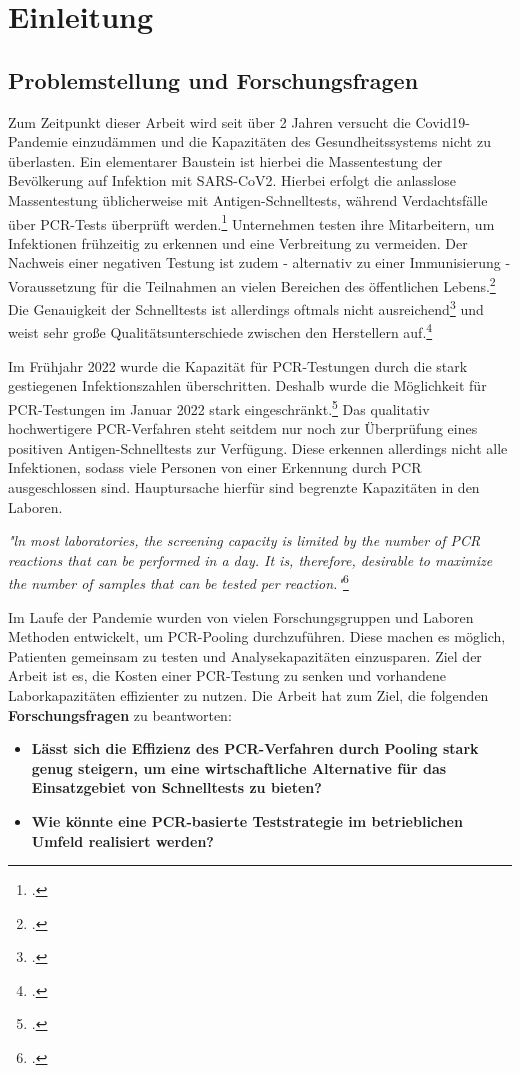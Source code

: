 \chapter{Einleitung}
\section{Problemstellung und Forschungsfragen}
Zum Zeitpunkt dieser Arbeit wird seit über 2 Jahren versucht die Covid19-Pandemie einzudämmen und die Kapazitäten des Gesundheitssystems nicht zu überlasten.
Ein elementarer Baustein ist hierbei die Massentestung der Bevölkerung auf Infektion mit SARS-CoV2.
Hierbei erfolgt die anlasslose Massentestung üblicherweise mit Antigen-Schnelltests, während Verdachtsfälle über PCR-Tests überprüft werden.\footcite{bund_testverordnung_2021}
Unternehmen testen ihre Mitarbeitern, um Infektionen frühzeitig zu erkennen und eine Verbreitung zu vermeiden.
Der Nachweis einer negativen Testung ist zudem - alternativ zu einer Immunisierung - Voraussetzung für die Teilnahmen an vielen Bereichen des öffentlichen Lebens.\footcite{land_corona-verordnung_2022}
Die Genauigkeit der Schnelltests ist allerdings oftmals nicht ausreichend\footcite{wagenhauser_clinical_2021} und weist sehr große Qualitätsunterschiede zwischen den Herstellern auf.\footcite{zerforschung_zerforschung_2022}

Im Frühjahr 2022 wurde die Kapazität für PCR-Testungen durch die stark gestiegenen Infektionszahlen überschritten.
Deshalb wurde die Möglichkeit für PCR-Testungen im Januar 2022 stark eingeschränkt.\footcite{land_corona-verordnung_2022}
Das qualitativ hochwertigere PCR-Verfahren steht seitdem nur noch zur Überprüfung eines positiven Antigen-Schnelltests zur Verfügung.
Diese erkennen allerdings nicht alle Infektionen, sodass viele Personen von einer Erkennung durch PCR ausgeschlossen sind.
Hauptursache hierfür sind begrenzte Kapazitäten in den Laboren.

\textit{"ln most laboratories, the screening capacity is limited by the number of PCR reactions that can be performed in a day. It is, therefore, desirable to maximize the number of samples that can be tested per reaction."}\footcite{viehweger_increased_2020}

Im Laufe der Pandemie wurden von vielen Forschungsgruppen und Laboren Methoden entwickelt, um PCR-Pooling durchzuführen.
Diese machen es möglich, Patienten gemeinsam zu testen und Analysekapazitäten einzusparen.
Ziel der Arbeit ist es, die Kosten einer PCR-Testung zu senken und vorhandene Laborkapazitäten effizienter zu nutzen.
\cleardoublepage
Die Arbeit hat zum Ziel, die folgenden \textbf{Forschungsfragen} zu beantworten:
\begin{itemize}
	\item \textbf{Lässt sich die Effizienz des PCR-Verfahren durch Pooling stark genug steigern, um eine wirtschaftliche Alternative für das Einsatzgebiet von Schnelltests zu bieten?}
	\item \textbf{Wie könnte eine PCR-basierte Teststrategie im betrieblichen Umfeld realisiert werden?}
\end{itemize}

